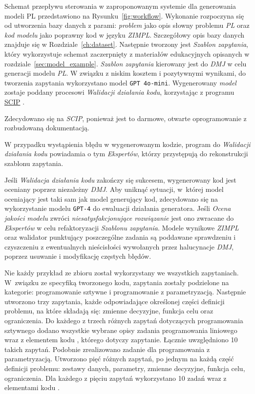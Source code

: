 Schemat przepływu sterowania w zaproponowanym systemie dla generowania modeli PL przedstawiono na Rysunku~\ref{fig:workflow}. Wykonanie rozpoczyna się od utworzenia bazy danych z parami: \textit{problem} jako opis słowny problemu \textit{PL} oraz \textit{kod modelu} jako poprawny kod w języku \textit{ZIMPL}. Szczegółowy opis bazy danych znajduje się w Rozdziale~\ref{ch:dataset}. Następnie tworzony jest \textit{Szablon zapytania}, który wykorzystuje schemat zaczerpnięty z materiałów edukacyjnych opisanych w rozdziale~\ref{sec:model_example}. \textit{Szablon zapytania} kierowany jest do \textit{DMJ} w celu generacji modelu \textit{PL}. W związku z niskim kosztem i pozytywnymi wynikami, do tworzenia zapytania wykorzystano model \texttt{GPT 4o-mini}. Wygenerowany \textit{model} zostaje poddany procesowi \textit{Walidacji działania kodu}, korzystając z programu \href{https://www.scipopt.org/}{SCIP} \cite{BolusaniEtal2024ZR}. 

 Zdecydowano się na \textit{SCIP}, ponieważ jest to darmowe, otwarte oprogramowanie z rozbudowaną dokumentacją.
 
 W przypadku wystąpienia błędu w wygenerowanym kodzie, program do \textit{Walidacji działania kodu} powiadamia o tym \textit{Ekspertów}, którzy przystępują do rekonstrukcji szablonu zapytania.

Jeśli \textit{Walidacja działania kodu} zakończy się sukcesem, wygenerowany kod jest oceniany poprzez niezależny \textit{DMJ}. Aby uniknąć sytuacji, w~której model oceniający jest taki sam jak model generujący kod, zdecydowano się na wykorzystanie modelu \texttt{GPT-4} do ewaluacji działania generatora. Jeśli \textit{Ocena jakości modelu} zwróci \textit{niesatysfakcjonujące rozwiązanie} jest ono zwracane do \textit{Ekspertów} w celu refaktoryzacji \textit{Szablonu zapytania}. Modele wynikowe \textit{ZIMPL} oraz walidator punktujący poszczególne zadania są poddawane sprawdzeniu i czyszczeniu z ewentualnych nieścisłości wywołanych przez halucynacje \textit{DMJ}, poprzez usuwanie i modyfikację częstych błędów.

Nie każdy przykład ze zbioru został wykorzystany we wszystkich zapytaniach. W~związku ze specyfiką tworzonego kodu, zapytania zostały podzielone na kategorie: programowanie sztywne i programowanie z parametryzacją. Następnie utworzono trzy zapytania, każde odpowiadające określonej części definicji problemu, na które składają się: zmienne decyzyjne, funkcja celu oraz ograniczenia. Do każdego z trzech różnych zapytań dotyczących programowania sztywnego 
dodano wszystkie wybrane opisy zadania programowania liniowego
wraz z elementem kodu  , którego dotyczy zapytanie. Łącznie uwzględniono 10 takich zapytań. Podobnie zrealizowano zadanie dla programowania z parametryzacją. Utworzono pięć różnych zapytań, po jednym na każdą część definicji problemu: zestawy danych, parametry, zmienne decyzyjne, funkcja celu, ograniczenia. Dla każdego z pięciu zapytań wykorzystano 10 zadań wraz z elementami kodu  .


